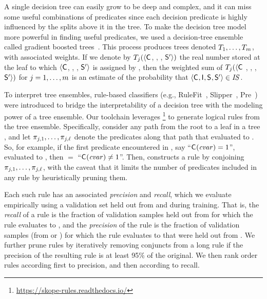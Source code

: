 A single decision tree can easily grow to be deep and complex, and it
can miss some useful combinations of predicates since each decision
predicate is highly influenced by the splits above it in the tree.  To
make the decision tree model more powerful in finding useful
predicates, we used a decision-tree ensemble called gradient boosted
trees~\cite{friedman2001greedy}.  This process produces \gbTreeNmbr
trees denoted $T_{1}, \ldots, T_{m}$, with
associated weights.  If we denote by
$T_{j}(\langle\mathsf{C}_{}$, \AIIFn{}, \SecFn{},
$\mathsf{S}'_{}\rangle)$ the real number stored at the leaf to which
$\langle\mathsf{C}_{}$, \AIIFn{}, \SecFn{}, $\mathsf{S}'_{}\rangle$ is
assigned by \gbTree{\gbTreeIdx}, then the weighted sum of
$T_{j}(\langle\mathsf{C}_{}$ , \AIIFn{}, \SecFn{},
$\mathsf{S}'_{}\rangle)$ for $j = 1, \ldots, m$ is an
estimate of the probability that
$\langle\mathsf{C}_{},\mathsf{I}_{},\mathsf{S}_{},\mathsf{S}'_{}\rangle \in
\mathit{IS}$.

To interpret tree ensembles, rule-based classifiers (e.g.,
RuleFit~\cite{friedman2008predictive}, Slipper~\cite{cohen1999simple},
Pre~\cite{fokkema2017pre}) were introduced to bridge the
interpretability of a decision tree with the modeling power of a tree
ensemble.  Our toolchain leverages
\SkopeRule\footnote{\url{https://skope-rules.readthedocs.io/}} to
generate logical rules from the tree ensemble.  Specifically,
consider any path from the root to a leaf in a tree
\gbTree{\gbTreeIdx}, and let $\pi_{{j},{1}}, \ldots,
\pi_{{j},{\ell}}$ denote the predicates along that
path that evaluated to \boolTrue.  So, for example, if the first
predicate encountered in \gbTree{\gbTreeIdx}, say ``$\mathsf{C}_{}(\mathit{cvar})
= 1$'', evaluated to \boolFalse, then  $=$
``$\mathsf{C}_{}(\mathit{cvar}) \neq 1$''.  Then, \SkopeRule constructs a rule by
conjoining $\pi_{{j},{1}}, \ldots,
\pi_{{j},{\ell}}$, with the caveat that it limits the
number of predicates included in any rule by heuristically pruning
them.

Each such rule has an associated \textit{precision} and
\textit{recall}, which we evaluate empirically using a validation set
held out from \noninterferenceSetSamples and \interferenceSetSamples
during training.  That is, the \textit{recall} of a rule is the
fraction of validation samples held out from \interferenceSetSamples
for which the rule evaluates to \boolTrue, and the \textit{precision}
of the rule is the fraction of validation samples (from
\interferenceSetSamples or \noninterferenceSetSamples) for which the
rule evaluates to \boolTrue that were held out from
\interferenceSetSamples.  We further prune rules by iteratively
removing conjuncts from a long rule if the precision of the resulting
rule is at least 95\% of the original.  We then rank order rules
according first to precision, and then according to recall.

